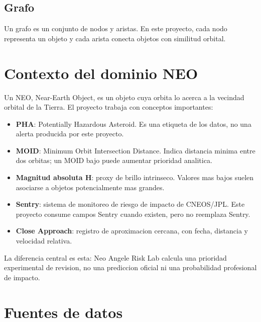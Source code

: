\documentclass[11pt,letterpaper]{article}
\newcommand{\project}{Neo Angele Risk Lab}
\begin{document}
\subsection{Grafo}

Un grafo es un conjunto de nodos y aristas. En este proyecto, cada nodo representa un objeto y cada arista conecta objetos con similitud orbital.

\section{Contexto del dominio NEO}

Un NEO, Near-Earth Object, es un objeto cuya orbita lo acerca a la vecindad orbital de la Tierra. El proyecto trabaja con conceptos importantes:

\begin{itemize}
  \item \textbf{PHA}: Potentially Hazardous Asteroid. Es una etiqueta de los datos, no una alerta producida por este proyecto.
  \item \textbf{MOID}: Minimum Orbit Intersection Distance. Indica distancia minima entre dos orbitas; un MOID bajo puede aumentar prioridad analitica.
  \item \textbf{Magnitud absoluta H}: proxy de brillo intrinseco. Valores mas bajos suelen asociarse a objetos potencialmente mas grandes.
  \item \textbf{Sentry}: sistema de monitoreo de riesgo de impacto de CNEOS/JPL. Este proyecto consume campos Sentry cuando existen, pero no reemplaza Sentry.
  \item \textbf{Close Approach}: registro de aproximacion cercana, con fecha, distancia y velocidad relativa.
\end{itemize}

La diferencia central es esta: \project{} calcula una prioridad experimental de revision, no una prediccion oficial ni una probabilidad profesional de impacto.

\section{Fuentes de datos}
\end{document}
